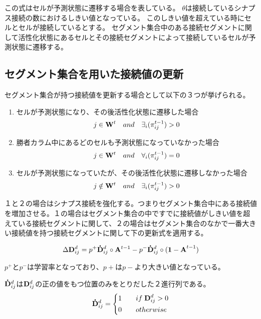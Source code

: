 この式はセルが予測状態に遷移する場合を表している。
$\theta$は接続しているシナプス接続の数におけるしきい値となっている。
このしきい値を超えている時にセルとセルが接続しているとする。
セグメント集合中のある接続セグメントに関して活性化状態にあるセルとその接続セグメントによって接続しているセルが予測状態に遷移する。
\subsection{セグメント集合を用いた接続値の更新}
セグメント集合が持つ接続値を更新する場合として以下の３つが挙げられる。
\begin{enumerate}
  \item セルが予測状態になり、その後活性化状態に遷移した場合
  \begin{equation}
    j \in {\bf W}^ t \quad and \quad \exists_{i}(\pi^{t-1}_{ij}) > 0
  \end{equation}

  \item 勝者カラム中にあるどのセルも予測状態になっていなかった場合
  \begin{equation}
    j \in {\bf W}^t \quad and \quad \forall_{i}(\pi^{t-1}_{ij}) = 0
  \end{equation}

  \item セルが予測状態になっていたが、その後活性化状態に遷移しなかった場合
  \begin{equation}
    j \notin {\bf W}^ t \quad and \quad \exists_{i}(\pi^{t-1}_{ij}) > 0
  \end{equation}

\end{enumerate}

１と２の場合はシナプス接続を強化する。つまりセグメント集合中にある接続値を増加させる。１の場合はセグメント集合の中ですでに接続値がしきい値を超えている接続セグメントに関して、２の場合はセグメント集合のなかで一番大きい接続値を持つ接続セグメントに関して下の更新式を適用する。

\begin{equation}
  \Delta {\bf D}^d_{ij} = p^+{\bf \dot{D}}^d_{ij} \circ {\bf A}^{t-1} - p^-{\bf \dot{D}}^d_{ij} \circ {\bf (1 - A}^{t-1})
\end{equation}

$p^+$と$p^-$は学習率となっており、$p+$は$p-$より大きい値となっている。

${\bf \dot{D}}^d_{ij}$は${\bf D}^d_{ij}$の正の値をもつ位置のみをとりだした２進行列である。
\begin{equation}
  {\bf \dot{D}}^d_{ij} =
  \left\{
  \begin{alignedat}{2}
    1 \qquad &if \; {\bf D}^d_{ij} > 0\\
    0 \qquad &otherwise
  \end{alignedat}
  \right.
\end{equation}

